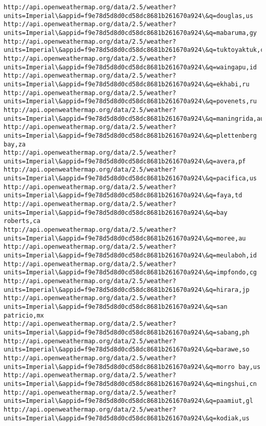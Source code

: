 \documentclass[11pt]{article}
\begin{document}
\begin{Verbatim}[commandchars=\\\{\}]
http://api.openweathermap.org/data/2.5/weather?units=Imperial\&appid=f9e78d5d8d0cd58dc8681b261670a924\&q=douglas,us
http://api.openweathermap.org/data/2.5/weather?units=Imperial\&appid=f9e78d5d8d0cd58dc8681b261670a924\&q=mabaruma,gy
http://api.openweathermap.org/data/2.5/weather?units=Imperial\&appid=f9e78d5d8d0cd58dc8681b261670a924\&q=tuktoyaktuk,ca
http://api.openweathermap.org/data/2.5/weather?units=Imperial\&appid=f9e78d5d8d0cd58dc8681b261670a924\&q=waingapu,id
http://api.openweathermap.org/data/2.5/weather?units=Imperial\&appid=f9e78d5d8d0cd58dc8681b261670a924\&q=ekhabi,ru
http://api.openweathermap.org/data/2.5/weather?units=Imperial\&appid=f9e78d5d8d0cd58dc8681b261670a924\&q=povenets,ru
http://api.openweathermap.org/data/2.5/weather?units=Imperial\&appid=f9e78d5d8d0cd58dc8681b261670a924\&q=maningrida,au
http://api.openweathermap.org/data/2.5/weather?units=Imperial\&appid=f9e78d5d8d0cd58dc8681b261670a924\&q=plettenberg bay,za
http://api.openweathermap.org/data/2.5/weather?units=Imperial\&appid=f9e78d5d8d0cd58dc8681b261670a924\&q=avera,pf
http://api.openweathermap.org/data/2.5/weather?units=Imperial\&appid=f9e78d5d8d0cd58dc8681b261670a924\&q=pacifica,us
http://api.openweathermap.org/data/2.5/weather?units=Imperial\&appid=f9e78d5d8d0cd58dc8681b261670a924\&q=faya,td
http://api.openweathermap.org/data/2.5/weather?units=Imperial\&appid=f9e78d5d8d0cd58dc8681b261670a924\&q=bay roberts,ca
http://api.openweathermap.org/data/2.5/weather?units=Imperial\&appid=f9e78d5d8d0cd58dc8681b261670a924\&q=moree,au
http://api.openweathermap.org/data/2.5/weather?units=Imperial\&appid=f9e78d5d8d0cd58dc8681b261670a924\&q=meulaboh,id
http://api.openweathermap.org/data/2.5/weather?units=Imperial\&appid=f9e78d5d8d0cd58dc8681b261670a924\&q=impfondo,cg
http://api.openweathermap.org/data/2.5/weather?units=Imperial\&appid=f9e78d5d8d0cd58dc8681b261670a924\&q=hirara,jp
http://api.openweathermap.org/data/2.5/weather?units=Imperial\&appid=f9e78d5d8d0cd58dc8681b261670a924\&q=san patricio,mx
http://api.openweathermap.org/data/2.5/weather?units=Imperial\&appid=f9e78d5d8d0cd58dc8681b261670a924\&q=sabang,ph
http://api.openweathermap.org/data/2.5/weather?units=Imperial\&appid=f9e78d5d8d0cd58dc8681b261670a924\&q=barawe,so
http://api.openweathermap.org/data/2.5/weather?units=Imperial\&appid=f9e78d5d8d0cd58dc8681b261670a924\&q=morro bay,us
http://api.openweathermap.org/data/2.5/weather?units=Imperial\&appid=f9e78d5d8d0cd58dc8681b261670a924\&q=mingshui,cn
http://api.openweathermap.org/data/2.5/weather?units=Imperial\&appid=f9e78d5d8d0cd58dc8681b261670a924\&q=paamiut,gl
http://api.openweathermap.org/data/2.5/weather?units=Imperial\&appid=f9e78d5d8d0cd58dc8681b261670a924\&q=kodiak,us

\end{Verbatim}
\end{document}
